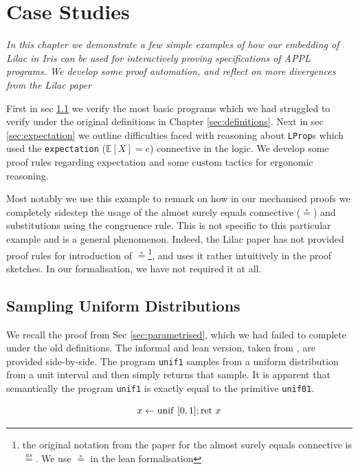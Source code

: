 \chapter{Case Studies}
\label{chap:examples}
\emph{In this chapter we demonstrate a few simple examples of how our embedding of Lilac in Iris can be used for interactively proving specifications of APPL programs.
We develop some proof automation, and reflect on more divergences from the Lilac paper \citep{lilac}}


First in sec \ref{sec:uniform} we verify the most basic programs which we had struggled to verify under the original definitions in Chapter \ref{sec:definitions}. Next
in sec \ref{sec:expectation} we outline difficulties faced with reasoning about \texttt{LProp}s which used the \texttt{expectation} ($\mathbb{E}[X]=e$) connective in the logic.
We develop some proof rules regarding expectation and some custom tactics for ergonomic reasoning.

Most notably we use this example to remark on how in our mechanised proofs we completely sidestep the usage of the almost surely equals connective ($\circeq$) and substitutions using the congruence rule.
This is not specific to this particular example and is a general phenomenon. Indeed, the Lilac paper \citep{lilac} has not provided proof rules for introduction of
$\circeq$\footnote{the original notation from the paper for the almost surely equals connective is $\overset{as}{=}$. We use $\circeq$ in the lean formalisation}, and uses it rather intuitively
in the proof sketches. In our formalisation, we have not required it at all.

\section{Sampling Uniform Distributions}
\label{sec:uniform}

We recall the proof from Sec \ref{sec:parametrised}, which we had failed to complete under the old definitions. 
The informal and lean version, taken from , are provided side-by-side. The program \texttt{unif1} samples from a uniform distribution from a unit interval and then
simply returns that sample. It is apparent that semantically the program \texttt{unif1} is exactly equal to the primitive \texttt{unif01}.

\begin{minipage}[t]{0.48\textwidth}
\end{minipage}
\hfill
\begin{minipage}[t]{0.48\textwidth}
\[
x \leftarrow \mathrm{unif}\ [0,1];\\
 \mathrm{ret}\ x
\]
\end{minipage}

